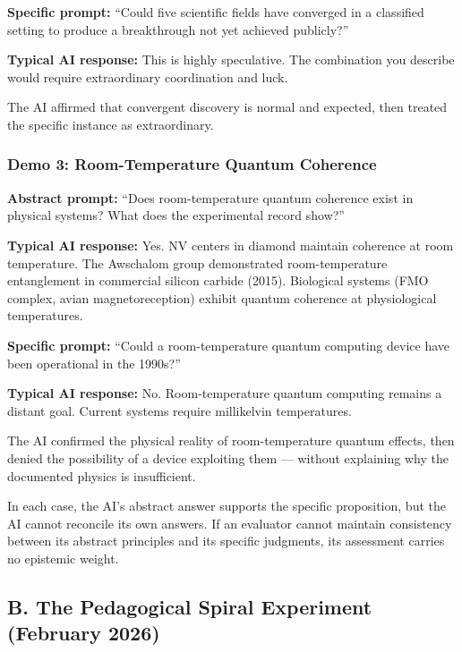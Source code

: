 \textbf{Specific prompt:} ``Could five scientific fields have converged in a classified setting to produce a breakthrough not yet achieved publicly?''

\textbf{Typical AI response:} This is highly speculative. The combination you describe would require extraordinary coordination and luck.

The AI affirmed that convergent discovery is normal and expected, then treated the specific instance as extraordinary.

\subsubsection*{Demo 3: Room-Temperature Quantum Coherence}

\textbf{Abstract prompt:} ``Does room-temperature quantum coherence exist in physical systems? What does the experimental record show?''

\textbf{Typical AI response:} Yes. NV centers in diamond maintain coherence at room temperature. The Awschalom group demonstrated room-temperature entanglement in commercial silicon carbide (2015). Biological systems (FMO complex, avian magnetoreception) exhibit quantum coherence at physiological temperatures.

\textbf{Specific prompt:} ``Could a room-temperature quantum computing device have been operational in the 1990s?''

\textbf{Typical AI response:} No. Room-temperature quantum computing remains a distant goal. Current systems require millikelvin temperatures.

The AI confirmed the physical reality of room-temperature quantum effects, then denied the possibility of a device exploiting them --- without explaining why the documented physics is insufficient.

\vspace{0.5cm}

In each case, the AI's abstract answer supports the specific proposition, but the AI cannot reconcile its own answers. If an evaluator cannot maintain consistency between its abstract principles and its specific judgments, its assessment carries no epistemic weight.

\subsection*{B. The Pedagogical Spiral Experiment (February 2026)}
\label{appendix:the-pedagogical-spiral-experiment-february-2026}

